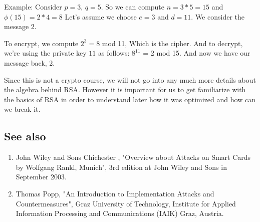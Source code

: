 Example: Consider $p = 3$, $q = 5$. So we can compute $n = 3*5 = 15$ and
$\phi(15) = 2 * 4 = 8$ Let's assume we choose $e = 3$ and $d=11$. We consider
the message 2.

To encrypt, we compute $2^{3} = 8$ mod 11, Which is the cipher. And to decrypt,
we're using the private key $11$ as follows: $8^{11}$ = 2 mod 15. And now we
have our message back, 2.

Since this is not a crypto course, we will not go into any much more details
about the algebra behind RSA. However it is important for us to get familiarize
with the basics of RSA in order to understand later how it was optimized and how
can we break it.

\subsection{See also}
\begin{enumerate}
    \item John Wiley and Sons Chichester , "Overview about Attacks on Smart
    Cards by Wolfgang Rankl, Munich", 3rd edition at John Wiley and Sons in
    September 2003.
    \item Thomas Popp, "An Introduction to Implementation Attacks and
    Countermeasures", Graz University of Technology, Institute for Applied
    Information Processing and Communications (IAIK) Graz, Austria.
\end{enumerate}